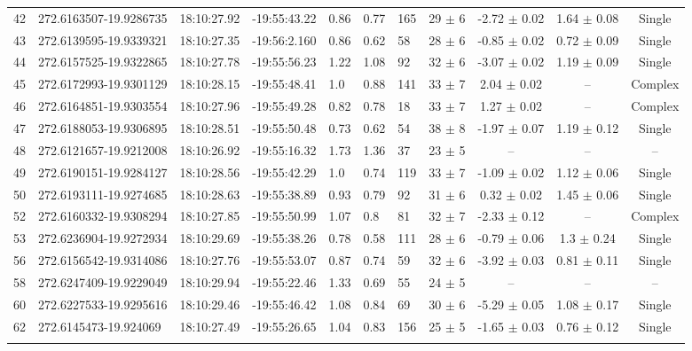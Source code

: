 \documentclass[longauth]{aa} %
\begin{document}
\begin{appendix}
\begin{table}[htbp!]
\begin{tabular}{llllllllccc}
42  &  272.6163507-19.9286735  &  18:10:27.92  &  -19:55:43.22  &  0.86  &  0.77  &  165  &  29 $\pm$ 6  &  -2.72 $\pm$ 0.02  &  1.64 $\pm$ 0.08  &  Single \\
43  &  272.6139595-19.9339321  &  18:10:27.35  &  -19:56:2.160  &  0.86  &  0.62  &  58  &  28 $\pm$ 6  &  -0.85 $\pm$ 0.02  &  0.72 $\pm$ 0.09  &  Single \\
44  &  272.6157525-19.9322865  &  18:10:27.78  &  -19:55:56.23  &  1.22  &  1.08  &  92  &  32 $\pm$ 6  &  -3.07 $\pm$ 0.02  &  1.19 $\pm$ 0.09  &  Single \\
45  &  272.6172993-19.9301129  &  18:10:28.15  &  -19:55:48.41  &  1.0  &  0.88  &  141  &  33 $\pm$ 7  &  2.04 $\pm$ 0.02  &  --  &  Complex \\
46  &  272.6164851-19.9303554  &  18:10:27.96  &  -19:55:49.28  &  0.82  &  0.78  &  18  &  33 $\pm$ 7  &  1.27 $\pm$ 0.02  &  --  &  Complex \\
47  &  272.6188053-19.9306895  &  18:10:28.51  &  -19:55:50.48  &  0.73  &  0.62  &  54  &  38 $\pm$ 8  &  -1.97 $\pm$ 0.07  &  1.19 $\pm$ 0.12  &  Single \\
48  &  272.6121657-19.9212008  &  18:10:26.92  &  -19:55:16.32  &  1.73  &  1.36  &  37  &  23 $\pm$ 5  &  --  &  --  &  -- \\
49  &  272.6190151-19.9284127  &  18:10:28.56  &  -19:55:42.29  &  1.0  &  0.74  &  119  &  33 $\pm$ 7  &  -1.09 $\pm$ 0.02  &  1.12 $\pm$ 0.06  &  Single \\
50  &  272.6193111-19.9274685  &  18:10:28.63  &  -19:55:38.89  &  0.93  &  0.79  &  92  &  31 $\pm$ 6  &  0.32 $\pm$ 0.02  &  1.45 $\pm$ 0.06  &  Single \\
52  &  272.6160332-19.9308294  &  18:10:27.85  &  -19:55:50.99  &  1.07  &  0.8  &  81  &  32 $\pm$ 7  &  -2.33 $\pm$ 0.12  &  --  &  Complex \\
53  &  272.6236904-19.9272934  &  18:10:29.69  &  -19:55:38.26  &  0.78  &  0.58  &  111  &  28 $\pm$ 6  &  -0.79 $\pm$ 0.06  &  1.3 $\pm$ 0.24  &  Single \\
56  &  272.6156542-19.9314086  &  18:10:27.76  &  -19:55:53.07  &  0.87  &  0.74  &  59  &  32 $\pm$ 6  &  -3.92 $\pm$ 0.03  &  0.81 $\pm$ 0.11  &  Single \\
58  &  272.6247409-19.9229049  &  18:10:29.94  &  -19:55:22.46  &  1.33  &  0.69  &  55  &  24 $\pm$ 5  &  --  &  --  &  -- \\
60  &  272.6227533-19.9295616  &  18:10:29.46  &  -19:55:46.42  &  1.08  &  0.84  &  69  &  30 $\pm$ 6  &  -5.29 $\pm$ 0.05  &  1.08 $\pm$ 0.17  &  Single \\
62  &  272.6145473-19.924069  &  18:10:27.49  &  -19:55:26.65  &  1.04  &  0.83  &  156  &  25 $\pm$ 5  &  -1.65 $\pm$ 0.03  &  0.76 $\pm$ 0.12  &  Single \\
\hline \noalign {\smallskip}
\end{tabular}
\end{table}




\end{appendix}
\end{document}
